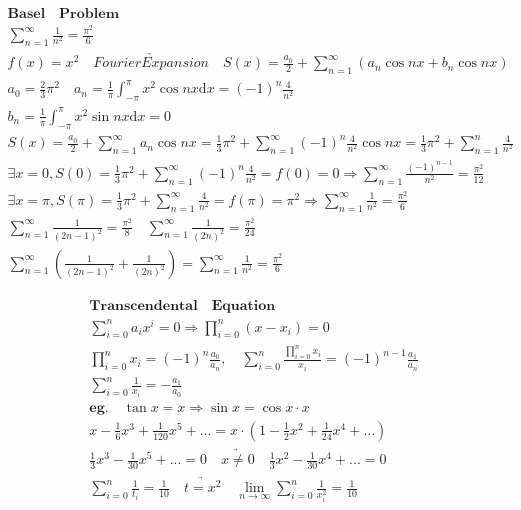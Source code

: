 \documentclass{article}
\begin{document}
\clearpage
\begin{align*}
    \bm{Basel \quad Problem} \\
    \sum_{n=1}^{\infty} \frac{1}{n^2} = \frac{\pi^2}{6} \\ 
    f(x) = x^2 \quad \underrightarrow{Fourier Expansion} \quad S(x) = \frac{a_{0}}{2}+\sum_{n=1}^{\infty}\left(a_{n}\cos nx+b_{n}\cos nx \right) \\
    a_{0} = \frac{2}{3}\pi^{2} \quad a_{n} = \frac{1}{\pi}\int_{-\pi}^{\pi} x^2 \cos nx \mathrm{d}x = (-1)^{n}\frac{4}{n^2}\\
    b_{n} = \frac{1}{\pi}\int_{-\pi}^{\pi} x^2 \sin nx \mathrm{d}x = 0 \\     
    S(x) = \frac{a_{0}}{2}+\sum_{n=1}^{\infty}a_{n}\cos nx= \frac{1}{3}\pi^{2} + \sum_{n=1}^{\infty}(-1)^{n}\frac{4}{n^2}\cos nx = \frac{1}{3}\pi^{2} + \sum_{n=1}^n\frac{4}{n^2} \\
    \exists x = 0, S(0) = \frac{1}{3}\pi^{2} + \sum_{n=1}^{\infty}(-1)^{n}\frac{4}{n^2} = f(0) = 0 \Longrightarrow \sum_{n=1}^{\infty}\frac{(-1)^{n-1}}{n^2} = \frac{\pi^{2}}{12}\\
    \exists x = \pi, S(\pi) = \frac{1}{3}\pi^{2} + \sum_{n=1}^{\infty}\frac{4}{n^2} = f(\pi) = \pi^2 \Longrightarrow \sum_{n=1}^{\infty}\frac{1}{n^2} = \frac{\pi^{2}}{6} \\ 
    \sum_{n=1}^{\infty}\frac{1}{(2n-1)^2} = \frac{\pi^{2}}{8} \quad \sum_{n=1}^{\infty}\frac{1}{(2n)^2} = \frac{\pi^{2}}{24} \\  
    \sum_{n=1}^{\infty}\left(\frac{1}{(2n-1)^2}+\frac{1}{(2n)^2}\right) = \sum_{n=1}^{\infty}{\frac{1}{n^2}} = \frac{\pi^{2}}{6}
\end{align*}

\clearpage
\begin{align*}
    \bm{Transcendental \quad Equation} \\ 
    \sum_{i=0}^{n}a_{i}x^i = 0 \Longrightarrow \prod_{i=0}^{n}(x-x_{i})=0 \\ 
    \prod_{i=0}^{n}x_{i} = (-1)^{n}\frac{a_{0}}{a_{n}},\quad \sum_{i=0}^{n}\frac{\prod_{i=0}^{n}x_{i}}{x_{i}} = (-1)^{n-1}\frac{a_{1}}{a_{n}} \\ 
    \sum_{i=0}^{n}\frac{1}{x_{i}} = -\frac{a_{1}}{a_{0}} \\ 
    \bm{eg.} \quad \tan x = x \Longrightarrow \sin{x} = \cos{x} \cdot x \\
    x - \frac{1}{6}x^3 + \frac{1}{120}x^5 +... = x \cdot (1-\frac{1}{2}x^2+\frac{1}{24}x^4+...) \\
    \frac{1}{3}x^3-\frac{1}{30}x^5+... = 0 \quad \underrightarrow{x \not= 0} \quad \frac{1}{3}x^2-\frac{1}{30}x^4+... = 0 \\
    \sum_{i=0}^{n}\frac{1}{t_{i}} = \frac{1}{10} \quad \underrightarrow{t = x^2} \quad \lim_{n \to \infty}\sum_{i=0}^{n}\frac{1}{x_{i}^2} = \frac{1}{10} 
\end{align*}
\end{document}
